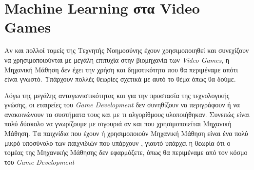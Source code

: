 \section{Machine Learning στα Video Games}
Αν και πολλοί τομείς της Τεχνητής Νοημοσύνης έχουν χρησιμοποιηθεί και συνεχίζουν να χρησιμοποιούνται με μεγάλη επιτυχία στην βιομηχανία των \textit{Video Games}, η Μηχανική Μάθηση δεν έχει την χρήση και δημοτικότητα που θα περιμέναμε απότι είναι γνωστό. Υπάρχουν πολλές θεωρίες σχετικά με αυτό το θέμα όπως θα δούμε. 
\par
Λόγω της μεγάλης ανταγωνιστικότητας και για την προστασία της τεχνολογικής γνώσης, οι εταιρείες του \textit{Game Development} δεν συνηθίζουν να περιγράφουν ή να ανακοινώνουν τα συστήματα τους και με τι αλγορίθμους υλοποιήθηκαν. Συνεπώς είναι πολύ δύσκολο να γνωρίζουμε με σιγουριά αν και που χρησιμοποιείται Μηχανική Μάθηση. Τα παιχνίδια που έχουν ή χρησιμοποιούν Μηχανική Μάθηση είναι ένα πολύ μικρό υποσύνολο των παιχνιδιών που υπάρχουν , γιαυτό υπάρχει η θεωρία ότι ο τομέας της Μηχανικής Μάθησης δεν εφαρμόζετε, όπως θα περιμέναμε από τον κόσμο του \textit{Game Development}









